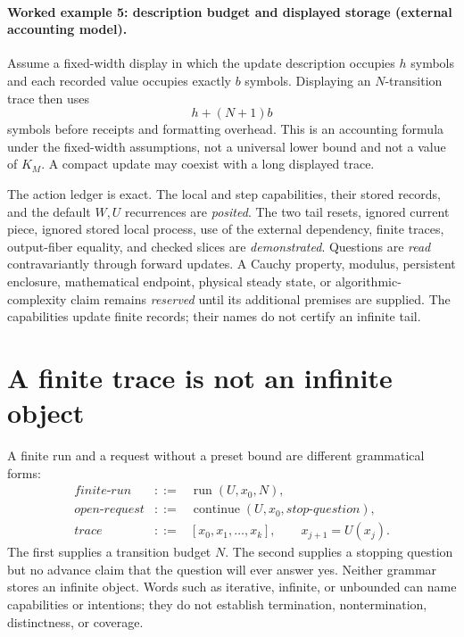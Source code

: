 \paragraph{Worked example 5: description budget and displayed storage (external accounting model).}
Assume a fixed-width display in which the update description occupies \(h\) symbols and each recorded value occupies
exactly \(b\) symbols.  Displaying an \(N\)-transition trace then uses
\[
                           h+(N+1)b
\]
symbols before receipts and formatting overhead.  This is an accounting formula under the fixed-width assumptions,
not a universal lower bound and not a value of \(K_M\).  A compact update may coexist with a long displayed trace.

The action ledger is exact.  The local and step capabilities, their stored records, and the default \(W,U\)
recurrences are \emph{posited}.  The two tail resets, ignored current piece, ignored stored local process, use of the
external dependency, finite traces, output-fiber equality, and
checked slices are \emph{demonstrated}.  Questions are \emph{read} contravariantly through forward updates.  A Cauchy
property, modulus, persistent enclosure, mathematical endpoint, physical steady state, or algorithmic-complexity claim
remains \emph{reserved} until its additional premises are supplied.  The capabilities update finite records; their
names do not certify an infinite tail.

\section{A finite trace is not an infinite object}

A finite run and a request without a preset bound are different grammatical forms:
\[
\begin{array}{rcl}
\textit{finite-run}&::=&\operatorname{run}(U,x_0,N),\\
\textit{open-request}&::=&\operatorname{continue}(U,x_0,\textit{stop-question}),\\
\textit{trace}&::=&[x_0,x_1,\ldots,x_k],\qquad x_{j+1}=U(x_j).
\end{array}
\]
The first supplies a transition budget \(N\).  The second supplies a stopping question but no advance claim that the
question will ever answer yes.  Neither grammar stores an infinite object.  Words such as iterative, infinite, or
unbounded can name capabilities or intentions; they do not establish termination, nontermination, distinctness, or
coverage.

